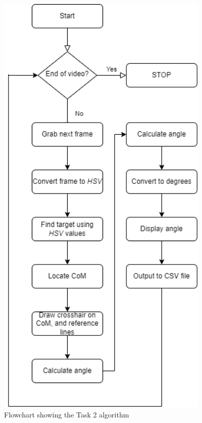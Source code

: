 \documentclass[conference]{IEEEtran}
\begin{document}
\begin{figure}[H]
\centering
\includegraphics[width=4in]{Task2_flowchart}
\caption{Flowchart showing the Task 2 algorithm}
\label{fig:task2_flowchart}
\end{figure}
\end{document}
